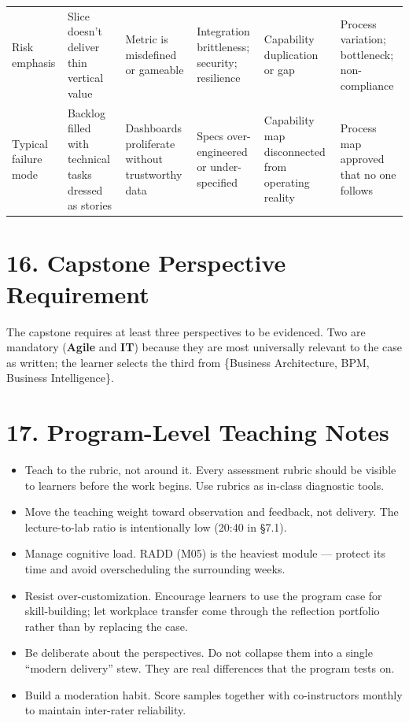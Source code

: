 \documentclass[11pt,letterpaper,oneside]{report}
\begin{document}
\begin{landscape}
\begin{longtable}{@{}R{2.40cm} R{3.60cm} R{3.60cm} R{3.60cm} R{3.60cm} R{3.60cm}@{}}
Risk emphasis
  & Slice doesn't deliver thin vertical value
  & Metric is misdefined or gameable
  & Integration brittleness; security; resilience
  & Capability duplication or gap
  & Process variation; bottleneck; non-compliance \\

Typical failure mode
  & Backlog filled with technical tasks dressed as stories
  & Dashboards proliferate without trustworthy data
  & Specs over-engineered or under-specified
  & Capability map disconnected from operating reality
  & Process map approved that no one follows \\

\end{longtable}
\end{landscape}

\section*{16. Capstone Perspective Requirement}
The capstone requires at least three perspectives to be evidenced. Two are mandatory (\textbf{Agile} and \textbf{IT}) because they are most universally relevant to the case as written; the learner selects the third from \{Business Architecture, BPM, Business Intelligence\}.


\section*{17. Program-Level Teaching Notes}
\begin{itemize}
  \item Teach to the rubric, not around it. Every assessment rubric should be visible to learners before the work begins. Use rubrics as in-class diagnostic tools.
  \item Move the teaching weight toward observation and feedback, not delivery. The lecture-to-lab ratio is intentionally low (20:40 in \S7.1).
  \item Manage cognitive load. RADD (M05) is the heaviest module --- protect its time and avoid overscheduling the surrounding weeks.
  \item Resist over-customization. Encourage learners to use the program case for skill-building; let workplace transfer come through the reflection portfolio rather than by replacing the case.
  \item Be deliberate about the perspectives. Do not collapse them into a single ``modern delivery'' stew. They are real differences that the program tests on.
  \item Build a moderation habit. Score samples together with co-instructors monthly to maintain inter-rater reliability.
\end{itemize}
\end{document}
